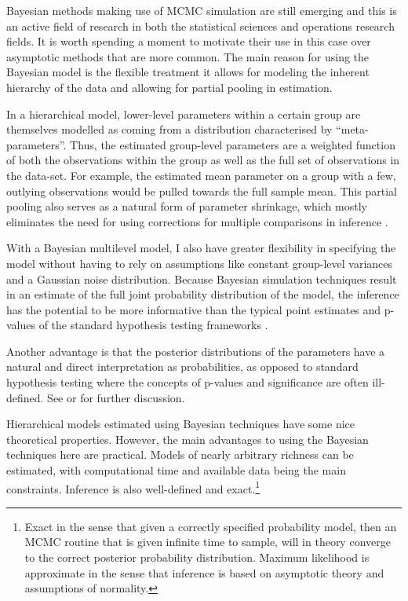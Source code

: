 \documentclass[a4paper]{article}
\begin{document}
Bayesian methods making use of MCMC simulation are still emerging and this is an active field of research in both the statistical sciences and operations research fields. It is worth spending a moment to motivate their use in this case over asymptotic methods that are more common. The main reason for using the Bayesian model is the flexible treatment it allows for modeling the inherent hierarchy of the data and allowing for partial pooling in estimation.

In a hierarchical model, lower-level parameters within a certain group are themselves modelled as coming from a distribution characterised by ``meta-parameters''. Thus, the estimated group-level parameters are a weighted function of both the observations within the group as well as the full set of observations in the data-set. For example, the estimated mean parameter on a group with a few, outlying observations would be pulled towards the full sample mean. This partial pooling also serves as a natural form of parameter shrinkage, which mostly eliminates the need for using corrections for multiple comparisons in inference \citep{gelman_data_2006}.

With a Bayesian multilevel model, I also have greater flexibility in specifying the model without having to rely on assumptions like constant group-level variances and a Gaussian noise distribution.  Because Bayesian simulation techniques result in an estimate of the full joint probability distribution of the model, the inference has the potential to be more informative than the typical point estimates and p-values of the standard hypothesis testing frameworks \citep{kruschke_doing_2014}.

Another advantage is that the posterior distributions of the parameters have a natural and direct interpretation as probabilities, as opposed to standard hypothesis testing where the concepts of p-values and significance are often ill-defined. See \citet{kruschke_doing_2014} or \citet{gelman_bayesian_2013} for further discussion.

Hierarchical models estimated using Bayesian techniques have some nice theoretical properties. However, the main advantages to using the Bayesian techniques here are practical. Models of nearly arbitrary richness can be estimated, with computational time and available data being the main constraints. Inference is also well-defined and exact.\footnote{Exact in the sense that given a correctly specified probability model, then an MCMC routine that is given infinite time to sample, will in theory converge to the correct posterior probability distribution. Maximum likelihood is approximate in the sense that inference is based on asymptotic theory and assumptions of normality.}
\end{document}
